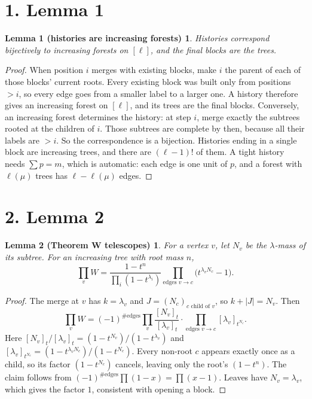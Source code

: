 \documentclass[10pt]{article}
\newtheorem*{lemma1}{Lemma 1 (histories are increasing forests)}
\newtheorem*{lemma2}{Lemma 2 (Theorem W telescopes)}
\begin{document}
\section*{1. Lemma 1}
\begin{lemma1}
Histories correspond bijectively to increasing forests on $[\ell]$, and the final blocks are the trees.
\end{lemma1}
\begin{proof}
When position $i$ merges with existing blocks, make $i$ the parent of each of those blocks' current roots. Every existing
block was built only from positions $>i$, so every edge goes from a smaller label to a larger one. A history therefore
gives an increasing forest on $[\ell]$, and its trees are the final blocks. Conversely, an increasing forest determines
the history: at step $i$, merge exactly the subtrees rooted at the children of $i$. Those subtrees are complete by then,
because all their labels are $>i$. So the correspondence is a bijection. Histories ending in a single block are
increasing trees, and there are $(\ell-1)!$ of them. A tight history needs $\sum p=m$, which is automatic: each edge is
one unit of $p$, and a forest with $\ell(\mu)$ trees has $\ell-\ell(\mu)$ edges.
\end{proof}

\section*{2. Lemma 2}
\begin{lemma2}
For a vertex $v$, let $N_v$ be the $\lambda$-mass of its subtree. For an increasing tree with root mass $n$,
\[
\prod_v W=\frac{1-t^n}{\prod_i(1-t^{\lambda_i})}\prod_{\text{edges }v\to c}\bigl(t^{\lambda_vN_c}-1\bigr).
\]
\end{lemma2}
\begin{proof}
The merge at $v$ has $k=\lambda_v$ and $J=(N_c)_{c\text{ child of }v}$, so $k+|J|=N_v$. Then
\[
\prod_v W=(-1)^{\#\text{edges}}\prod_v\frac{[N_v]_t}{[\lambda_v]_t}\cdot\prod_{\text{edges }v\to c}[\lambda_v]_{t^{N_c}}.
\]
Here $[N_v]_t/[\lambda_v]_t=(1-t^{N_v})/(1-t^{\lambda_v})$ and
$[\lambda_v]_{t^{N_c}}=(1-t^{\lambda_vN_c})/(1-t^{N_c})$. Every non-root $c$ appears exactly once as a child, so its
factor $(1-t^{N_c})$ cancels, leaving only the root's $(1-t^n)$. The claim follows from
$(-1)^{\#\text{edges}}\prod(1-x)=\prod(x-1)$. Leaves have $N_v=\lambda_v$, which gives the factor $1$, consistent with
opening a block.
\end{proof}
\end{document}
